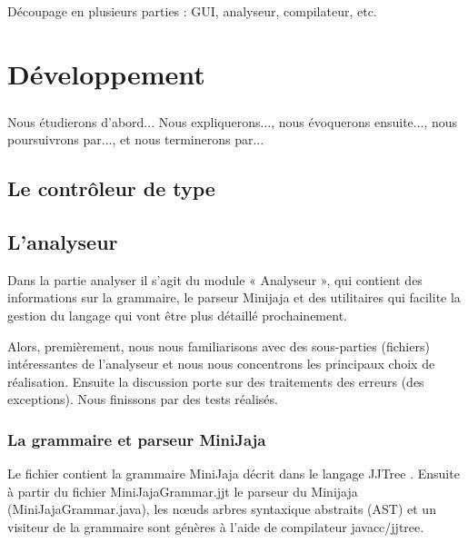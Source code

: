 \documentclass[a4paper,12pt]{report}
\begin{document}
\paragraph{}
Découpage en plusieurs parties : GUI, analyseur, compilateur, etc.

\chapter{Développement}
\paragraph{}
Nous étudierons d'abord... Nous expliquerons..., nous évoquerons ensuite..., nous poursuivrons par..., et nous terminerons par...
\section{Le contrôleur de type}
\paragraph{}

\section{L'analyseur}
Dans la partie analyser il s’agit du module « Analyseur », qui contient  des informations sur la grammaire, le parseur Minijaja et des utilitaires qui facilite la  gestion du langage qui vont être plus détaillé prochainement.
 
Alors, premièrement, nous nous familiarisons avec des sous-parties (fichiers) intéressantes de l’analyseur et nous nous concentrons les principaux choix de réalisation. Ensuite la discussion porte sur des traitements des  erreurs (des exceptions). Nous finissons par des tests réalisés.

\subsection{La grammaire et parseur MiniJaja}
Le fichier contient la grammaire MiniJaja décrit dans le langage JJTree . Ensuite à partir du fichier MiniJajaGrammar.jjt le parseur du Minijaja (MiniJajaGrammar.java), les nœuds arbres syntaxique abstraits (AST) et un visiteur de la grammaire sont génères à l’aide de compilateur javacc/jjtree.
\end{document}
